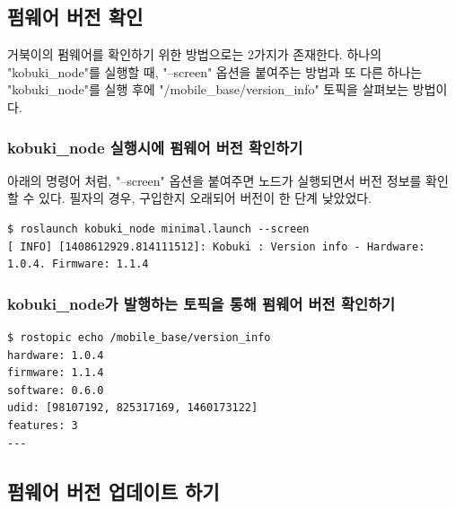 \subsection{펌웨어 버전 확인}

거북이의 펌웨어를 확인하기 위한 방법으로는 2가지가 존재한다. 하나의 "kobuki\_node"를 실행할 때, "--screen" 옵션을 붙여주는 방법과 또 다른 하나는 "kobuki\_node"를 실행 후에 "/mobile\_base/version\_info" 토픽을 살펴보는 방법이다.

\subsubsection{kobuki\_node 실행시에 펌웨어 버전 확인하기 }

아래의 명령어 처럼, "--screen" 옵션을 붙여주면 노드가 실행되면서 버전 정보를 확인할 수 있다. 필자의 경우, 구입한지 오래되어 버전이 한 단계 낮았었다.

\vspace{\baselineskip}
\begin{lstlisting}[language=ROS]
$ roslaunch kobuki_node minimal.launch --screen
[ INFO] [1408612929.814111512]: Kobuki : Version info - Hardware: 1.0.4. Firmware: 1.1.4
\end{lstlisting}


\subsubsection{kobuki\_node가 발행하는 토픽을 통해 펌웨어 버전 확인하기}

\vspace{\baselineskip}
\begin{lstlisting}[language=ROS]
$ rostopic echo /mobile_base/version_info 
hardware: 1.0.4
firmware: 1.1.4
software: 0.6.0
udid: [98107192, 825317169, 1460173122]
features: 3
---
\end{lstlisting}

\subsection{펌웨어 버전 업데이트 하기}


